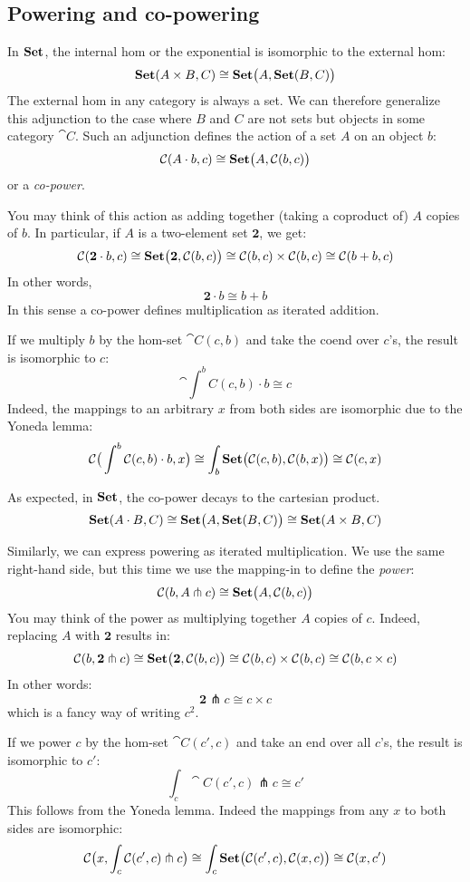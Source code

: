 \documentclass[DaoFP]{subfiles}
\begin{document}
\subsection{Powering and co-powering}

In $\mathbf{Set}$, the internal hom or the exponential is isomorphic to the external hom:
\[ \mathbf{Set} (A \times B, C) \cong \mathbf{Set} \big(A, \mathbf{Set} (B, C)\big) \]
The external hom in any category is always a set. We can therefore generalize this adjunction to the case where $B$ and $C$ are not sets but objects in some category $\cat C$. Such an adjunction defines the action of a set $A$ on an object $b$:
\[ \mathcal{C} (A \cdot b, c) \cong \mathbf{Set} \big( A, \mathcal{C} (b, c)\big) \]
or a \emph{co-power}.

You may think of this action as adding together (taking a coproduct of) $A$ copies of $b$. In particular, if $A$ is a two-element set $\mathbf 2$, we get:
\[ \mathcal{C} (\mathbf 2 \cdot b, c) \cong \mathbf{Set} \big( \mathbf 2, \mathcal{C} (b, c)\big) \cong \mathcal{C}(b, c) \times \mathcal{C}(b, c) \cong \mathcal{C}(b + b, c) \]
In other words, 
\[ \mathbf 2 \cdot b \cong b + b \]
In this sense a co-power defines multiplication as iterated addition. 

If we multiply $b$ by the hom-set $\cat C (c, b)$ and take the coend over $c$'s, the result is isomorphic to $c$:
\[ \cat \int^b C(c, b) \cdot b \cong c \]
Indeed, the mappings to an arbitrary $x$ from both sides are isomorphic due to the Yoneda lemma:
\[ \mathcal{C} \big( \int^b \mathcal{C}(c, b) \cdot b, x\big) \cong \int_b \mathbf{Set} \big( \mathcal{C}(c, b), \mathcal{C} (b, x)\big) \cong \mathcal{C} (c, x)\]



As expected, in $\mathbf{Set}$, the co-power decays to the cartesian product.
\[ \mathbf{Set} (A \cdot B, C) \cong \mathbf{Set} \big( A, \mathbf{Set}(B, C)\big) \cong \mathbf{Set} (A \times B, C) \]

Similarly, we can express powering as iterated multiplication. We use the same right-hand side, but this time we use the mapping-in to define the \emph{power}:
\[ \mathcal{C} (b, A \pitchfork c) \cong \mathbf{Set}  \big(A, \mathcal{C}(b, c)\big) \]
You may think of the power as multiplying together $A$ copies of $c$. Indeed, replacing $A$ with $\mathbf 2$ results in:
\[ \mathcal{C} (b, \mathbf 2 \pitchfork c) \cong \mathbf{Set}  \big(\mathbf 2, \mathcal{C}(b, c)\big) \cong \mathcal{C}(b, c) \times \mathcal{C}(b, c) \cong \mathcal{C} (b, c \times c)\]
In other words:
\[ \mathbf 2 \pitchfork c \cong c \times c \]
which is a fancy way of writing $c^2$.

If we power $c$ by the hom-set $\cat C(c', c)$ and take an end over all $c$'s, the result is isomorphic to $c'$:
\[ \int_c \cat C (c', c) \pitchfork c \cong c' \]
This follows from the Yoneda lemma. Indeed the mappings from any $x$ to both sides are isomorphic:
\[ \mathcal{C} \big(x, \int_c \mathcal{C} (c', c) \pitchfork c\big) \cong \int_c \mathbf{Set} \big( \mathcal{C}(c', c), \mathcal{C}(x, c)\big)  \cong \mathcal{C} (x, c') \]
\end{document}
